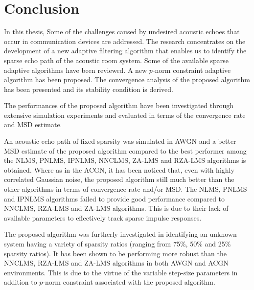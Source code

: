 
\section{Conclusion}\label{sec:6.1}
\vspace{-0.5cm}
\noindent In this thesis, Some of the challenges caused by undesired acoustic echoes that occur in communication devices are addressed. The research concentrates on the development of a new adaptive filtering algorithm that enables us to identify the sparse echo path of the acoustic
room system. Some of the available sparse adaptive algorithms have been reviewed. A new $p$-norm constraint adaptive algorithm has been proposed. The convergence analysis of the proposed algorithm has been presented and its stability condition is derived.


\vspace{-0.5cm}
\par
\noindent The performances of the proposed algorithm have been investigated through extensive simulation experiments and evaluated in terms of the convergence rate and MSD estimate.

\vspace{-0.5cm}
\par
\noindent An acoustic echo path of fixed sparsity was simulated in AWGN and a better MSD estimate of the proposed algorithm compared to the best performer among the NLMS, PNLMS, IPNLMS, NNCLMS, ZA-LMS and RZA-LMS algorithms is obtained. Where as in the ACGN, it has been noticed that, even with highly correlated Gaussian noise, the proposed algorithm still much better than the other algorithms in terms of convergence rate and/or MSD. The NLMS, PNLMS and IPNLMS algorithms failed to provide good performance compared to NNCLMS, RZA-LMS and ZA-LMS algorithms. This is due to their lack of available parameters to effectively track sparse impulse responses.


\vspace{-0.5cm}
\par
\noindent The proposed algorithm was furtherly investigated in identifying an unknown system having a variety of sparsity ratios (ranging from 75\%, 50\% and 25\% sparsity ratios). It has been shown to be performing  more robust than the NNCLMS, RZA-LMS and ZA-LMS algorithms in both AWGN and ACGN environments. This is due to the virtue of the variable step-size parameters in addition to $p$-norm constraint associated with the proposed algorithm.



